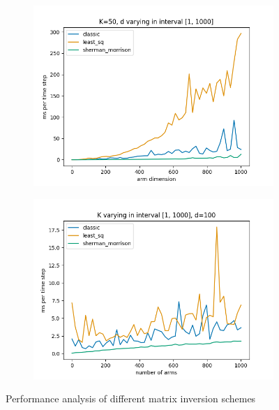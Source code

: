 \begin{figure}[h!]
  \centering
  \begin{subfigure}[b]{0.45\textwidth}
      \centering
      \includegraphics[width=\textwidth]{plots/d_varying_time.png}
      \label{fig:plot1}
  \end{subfigure}
  \hfill
  \begin{subfigure}[b]{0.45\textwidth}
      \centering
      \includegraphics[width=\textwidth]{plots/K_varying_time.png}
      \label{fig:plot2}
  \end{subfigure}
  \label{fig:combined_plots}
  \caption{Performance analysis of different matrix inversion schemes}
\end{figure}

